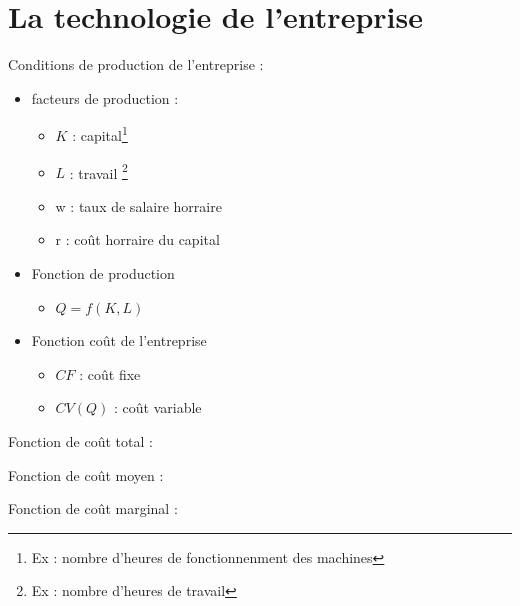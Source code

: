 \section{La technologie de l'entreprise}
Conditions de production de l'entreprise :
\begin{itemize}
\item facteurs de production : 
    \begin{itemize}
        \item $K$ : capital\footnote{Ex : nombre d'heures de fonctionnenment des machines}
        \item $L$ : travail \footnote{Ex : nombre d'heures de travail}
        \item w : taux de salaire horraire
        \item r : coût horraire du capital
    \end{itemize}
\item Fonction de production
    \begin{itemize}
        \item $Q = f(K,L)$
    \end{itemize}
\item Fonction coût de l'entreprise
    \begin{itemize}
        \item $CF$ : coût fixe
        \item $CV(Q)$ : coût variable
    \end{itemize}
\end{itemize}
Fonction de coût total :
\begin{center}
    \Large{}
\end{center}
Fonction de coût moyen :
\begin{center}
    \Large{}
\end{center}
Fonction de coût marginal :
\begin{center}
    \Large{}
\end{center}
\newpage
